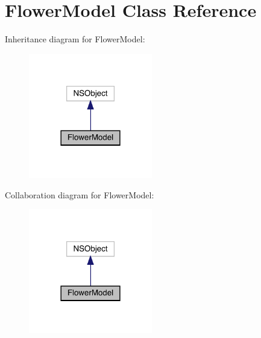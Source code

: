 \hypertarget{interface_flower_model}{}\section{Flower\+Model Class Reference}
\label{interface_flower_model}


Inheritance diagram for Flower\+Model\+:\nopagebreak
\begin{figure}[H]
\begin{center}
\leavevmode
\includegraphics[width=153pt]{interface_flower_model__inherit__graph}
\end{center}
\end{figure}


Collaboration diagram for Flower\+Model\+:\nopagebreak
\begin{figure}[H]
\begin{center}
\leavevmode
\includegraphics[width=153pt]{interface_flower_model__coll__graph}
\end{center}
\end{figure}
